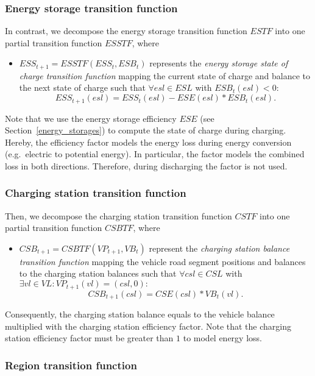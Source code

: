 \subsubsection{Energy storage transition function}
\label{transitions_storages}

In contrast, we decompose the energy storage transition function $ESTF$ into one partial transition function $ESSTF$, where
\begin{itemize}
	\item $ESS_{t+1} = ESSTF(ESS_t, ESB_t)$ represents the \textit{energy storage state of charge transition function} mapping the current state of charge and balance to the next state of charge such that $\forall esl \in ESL$ with $ESB_t(esl) < 0:$
	\[
		ESS_{t+1}(esl) = ESS_t(esl) - ESE(esl) * ESB_t(esl) \textrm{.}
	\]
\end{itemize}
Note that we use the energy storage efficiency $ESE$ (see Section~\ref{energy_storages}) to compute the state of charge during charging. Hereby, the efficiency factor models the energy loss during energy conversion (e.g.\ electric to potential energy). In particular, the factor models the combined loss in both directions. Therefore, during discharging the factor is not used.

\subsubsection{Charging station transition function}
\label{transitions_stations}

Then, we decompose the charging station transition function $CSTF$ into one partial transition function $CSBTF$, where
\begin{itemize}
	\item $CSB_{t+1} = CSBTF(VP_{t+1}, VB_t)$ represent the \textit{charging station balance transition function} mapping the vehicle road segment positions and balances to the charging station balances such that $\forall csl \in CSL$ with $\exists vl \in VL: VP_{t+1}(vl) = (csl, 0):$
	\[
		CSB_{t+1}(csl) = CSE(csl) * VB_{t}(vl) \textrm{.}
	\]
\end{itemize}
Consequently, the charging station balance equals to the vehicle balance multiplied with the charging station efficiency factor. Note that the charging station efficiency factor must be greater than $1$ to model energy loss.

\subsubsection{Region transition function}
\label{transitions_regions}

